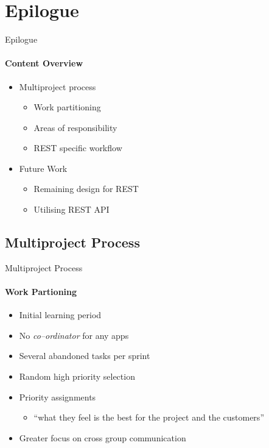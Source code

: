 \section{Epilogue}
    \begin{frame}[t]{Epilogue}\framesubtitle{Content Overview}
        \begin{itemize}
            \item Multiproject process
            \begin{itemize}
                \item Work partitioning
                \item Areas of responsibility
                \item REST specific workflow
            \end{itemize}
            \item Future Work
            \begin{itemize}
                \item Remaining design for REST
                \item Utilising REST API
            \end{itemize}
        \end{itemize}
    \end{frame}

    \subsection{Multiproject Process}
    \begin{frame}[t]{Multiproject Process}\framesubtitle{Work Partioning}
        \begin{itemize}
            \item Initial learning period
            \item No \textit{co--ordinator} for any apps
            \item Several abandoned tasks per sprint
            \item Random high priority selection
            \item Priority assignments
            \begin{itemize}
                \item ``what they feel is the best for the project and the customers''
            \end{itemize}
            \item Greater focus on cross group communication
        \end{itemize}
    \end{frame}

